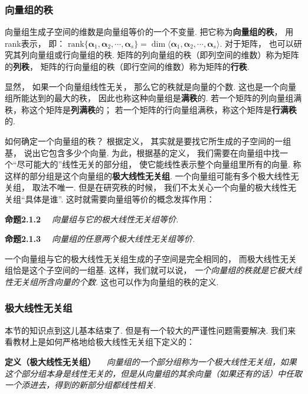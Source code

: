 \subsubsection{向量组的秩}

向量组生成子空间的维数是向量组等价的一个不变量.
把它称为\textbf{向量组的秩}，
用rank表示，
即：
$\text{rank}\{ \bm{\alpha}_1 , \bm{\alpha}_2 , \cdots , \bm{\alpha}_s \} = 
\dim \langle \bm{\alpha}_1 , \bm{\alpha}_2 , \cdots , \bm{\alpha}_s \rangle$.
对于矩阵，
也可以研究其列向量组或行向量组的秩.
矩阵的列向量组的秩（即列空间的维数）称为矩阵的\textbf{列秩}，
矩阵的行向量组的秩（即行空间的维数）称为矩阵的\textbf{行秩}.



显然，
如果一个向量组线性无关，
那么它的秩就是向量的个数.
这也是一个向量组所能达到的最大的秩，
因此也称这种向量组是\textbf{满秩}的.
若一个矩阵的列向量组满秩，称这个矩阵是\textbf{列满秩}的；
若一个矩阵的行向量组满秩，称这个矩阵是\textbf{行满秩}的.

如何确定一个向量组的秩？
根据定义，
其实就是要找它所生成的子空间的一组基，
说出它包含多少个向量.
为此，根据基的定义，
我们需要在向量组中找一个“尽可能大的”线性无关的部分组，
使它能线性表示整个向量组里所有的向量.
称这样的部分组是这个向量组的\textbf{极大线性无关组}.
一个向量组可能有多个极大线性无关组，
取法不唯一.
但是在研究秩的时候，
我们不太关心一个向量的极大线性无关组“具体是谁”.
这时就需要向量组等价的概念发挥作用：
\medskip

\textbf{命题2.1.2}
\textit{~~向量组与它的极大线性无关组等价.}

\medskip

\hypertarget{prop5}{}
\textbf{命题2.1.3}
\textit{~~向量组的任意两个极大线性无关组等价.}
\medskip

一个向量组与它的极大线性无关组生成的子空间是完全相同的，
而极大线性无关组恰是这个子空间的一组基.
这样，我们就可以说，
\textit{一个向量组的秩就是它极大线性无关组所含向量的个数}.
这也可以作为向量组的秩的定义.

\subsubsection{极大线性无关组}

本节的知识点到这儿基本结束了.
但是有一个较大的严谨性问题需要解决.
我们来看教材上是如何严格地给极大线性无关组下定义的：\medskip

\textbf{定义（极大线性无关组）}~~
\textit{向量组的一个部分组称为一个极大线性无关组，如果这个部分组本身是线性无关的，但是从向量组的其余向量（如果还有的话）中任取一个添进去，得到的新部分组都线性相关.}\medskip

